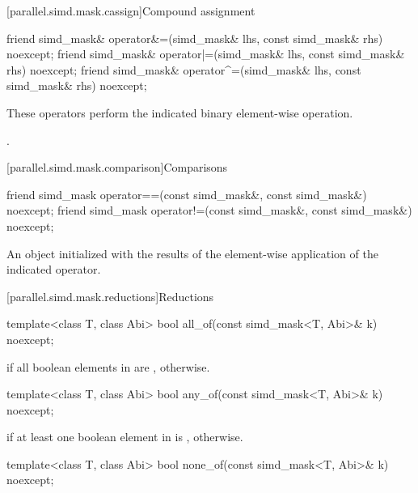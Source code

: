 [parallel.simd.mask.cassign]{Compound assignment}

\begin{itemdecl}
friend simd_mask& operator&=(simd_mask& lhs, const simd_mask& rhs) noexcept;
friend simd_mask& operator|=(simd_mask& lhs, const simd_mask& rhs) noexcept;
friend simd_mask& operator^=(simd_mask& lhs, const simd_mask& rhs) noexcept;
\end{itemdecl}

\begin{itemdescr}
  \pnum\effects
  These operators perform the indicated binary element-wise operation.

  \pnum\returns
  .
\end{itemdescr}

[parallel.simd.mask.comparison]{Comparisons}

\begin{itemdecl}
friend simd_mask operator==(const simd_mask&, const simd_mask&) noexcept;
friend simd_mask operator!=(const simd_mask&, const simd_mask&) noexcept;
\end{itemdecl}

\begin{itemdescr}
  \pnum\returns
  An object initialized with the results of the element-wise application of the indicated operator.
\end{itemdescr}

[parallel.simd.mask.reductions]{Reductions}

\begin{itemdecl}
template<class T, class Abi> bool all_of(const simd_mask<T, Abi>& k) noexcept;
\end{itemdecl}

\begin{itemdescr}
  \pnum\returns
   if all boolean elements in  are ,  otherwise.
\end{itemdescr}

\begin{itemdecl}
template<class T, class Abi> bool any_of(const simd_mask<T, Abi>& k) noexcept;
\end{itemdecl}

\begin{itemdescr}
  \pnum\returns
   if at least one boolean element in  is ,  otherwise.
\end{itemdescr}

\begin{itemdecl}
template<class T, class Abi> bool none_of(const simd_mask<T, Abi>& k) noexcept;
\end{itemdecl}

